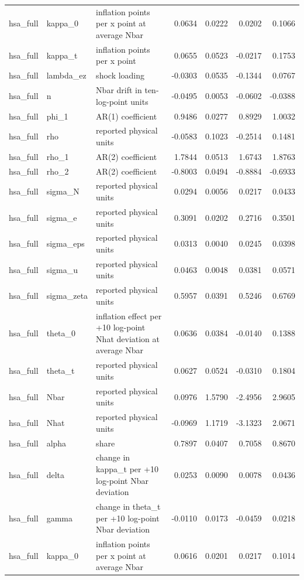 \begin{tabular}{lllrrrr}
hsa\_full & kappa\_0 & inflation points per x point at average Nbar & 0.0634 & 0.0222 & 0.0202 & 0.1066 \\
hsa\_full & kappa\_t & inflation points per x point & 0.0655 & 0.0523 & -0.0217 & 0.1753 \\
hsa\_full & lambda\_ez & shock loading & -0.0303 & 0.0535 & -0.1344 & 0.0767 \\
hsa\_full & n & Nbar drift in ten-log-point units & -0.0495 & 0.0053 & -0.0602 & -0.0388 \\
hsa\_full & phi\_1 & AR(1) coefficient & 0.9486 & 0.0277 & 0.8929 & 1.0032 \\
hsa\_full & rho & reported physical units & -0.0583 & 0.1023 & -0.2514 & 0.1481 \\
hsa\_full & rho\_1 & AR(2) coefficient & 1.7844 & 0.0513 & 1.6743 & 1.8763 \\
hsa\_full & rho\_2 & AR(2) coefficient & -0.8003 & 0.0494 & -0.8884 & -0.6933 \\
hsa\_full & sigma\_N & reported physical units & 0.0294 & 0.0056 & 0.0217 & 0.0433 \\
hsa\_full & sigma\_e & reported physical units & 0.3091 & 0.0202 & 0.2716 & 0.3501 \\
hsa\_full & sigma\_eps & reported physical units & 0.0313 & 0.0040 & 0.0245 & 0.0398 \\
hsa\_full & sigma\_u & reported physical units & 0.0463 & 0.0048 & 0.0381 & 0.0571 \\
hsa\_full & sigma\_zeta & reported physical units & 0.5957 & 0.0391 & 0.5246 & 0.6769 \\
hsa\_full & theta\_0 & inflation effect per +10 log-point Nhat deviation at average Nbar & 0.0636 & 0.0384 & -0.0140 & 0.1388 \\
hsa\_full & theta\_t & reported physical units & 0.0627 & 0.0524 & -0.0310 & 0.1804 \\
hsa\_full & Nbar & reported physical units & 0.0976 & 1.5790 & -2.4956 & 2.9605 \\
hsa\_full & Nhat & reported physical units & -0.0969 & 1.1719 & -3.1323 & 2.0671 \\
hsa\_full & alpha & share & 0.7897 & 0.0407 & 0.7058 & 0.8670 \\
hsa\_full & delta & change in kappa\_t per +10 log-point Nbar deviation & 0.0253 & 0.0090 & 0.0078 & 0.0436 \\
hsa\_full & gamma & change in theta\_t per +10 log-point Nbar deviation & -0.0110 & 0.0173 & -0.0459 & 0.0218 \\
hsa\_full & kappa\_0 & inflation points per x point at average Nbar & 0.0616 & 0.0201 & 0.0217 & 0.1014 \\

\end{tabular}
